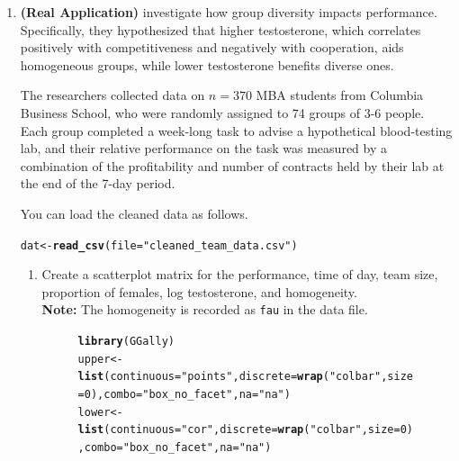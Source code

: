\documentclass{article}\usepackage[]{graphicx}\usepackage[]{xcolor}
\makeatletter
\newcommand{\hlnum}[1]{\textcolor[rgb]{0.686,0.059,0.569}{#1}}%
\newcommand{\hlsng}[1]{\textcolor[rgb]{0.192,0.494,0.8}{#1}}%
\newcommand{\hldef}[1]{\textcolor[rgb]{0.345,0.345,0.345}{#1}}%
\newcommand{\hlkwb}[1]{\textcolor[rgb]{0.69,0.353,0.396}{#1}}%
\newcommand{\hlkwc}[1]{\textcolor[rgb]{0.333,0.667,0.333}{#1}}%
\newcommand{\hlkwd}[1]{\textcolor[rgb]{0.737,0.353,0.396}{\textbf{#1}}}%
\newenvironment{kframe}{%
 \def\at@end@of@kframe{}%
 \ifinner\ifhmode%
  \def\at@end@of@kframe{\end{minipage}}%
  \begin{minipage}{\columnwidth}%
 \fi\fi%
 \def\FrameCommand##1{\hskip\@totalleftmargin \hskip-\fboxsep
 \colorbox{shadecolor}{##1}\hskip-\fboxsep
     \hskip-\linewidth \hskip-\@totalleftmargin \hskip\columnwidth}%
 \MakeFramed {\advance\hsize-\width
   \@totalleftmargin\z@ \linewidth\hsize
   \@setminipage}}%
 {\par\unskip\endMakeFramed%
 \at@end@of@kframe}
\newenvironment{knitrout}{}{} %
\makeatother
\begin{document}
\begin{enumerate}
\begin{enumerate}
  
\end{enumerate}
  \item \textbf{(Real Application)} \cite{Akinola18} investigate how group 
  diversity impacts performance. Specifically, they hypothesized that higher 
  testosterone, which correlates positively with competitiveness and negatively 
  with cooperation, aids homogeneous groups, while lower testosterone benefits 
  diverse ones.
  
  The researchers collected data on $n=370$ MBA students from Columbia 
  Business School, who were randomly assigned to 74 groups of 3-6 people.
  Each group completed a week-long task to advise a hypothetical blood-testing 
  lab, and their relative performance on the task was measured by a combination 
  of the profitability and number of contracts held by their lab at the end of 
  the 7-day period.

  You can load the cleaned data as follows.
\begin{knitrout}\scriptsize
{}\color{fgcolor}\begin{kframe}
\begin{alltt}
\hldef{dat} \hlkwb{<-} \hlkwd{read_csv}\hldef{(}\hlkwc{file} \hldef{=} \hlsng{"cleaned_team_data.csv"}\hldef{)}
\end{alltt}
\end{kframe}
\end{knitrout}
  \begin{enumerate}
      \item Create a scatterplot matrix for the performance, time of day, team
      size, proportion of females, log testosterone, and homogeneity.\\
      \textbf{Note:} The homogeneity is recorded as \texttt{fau} in the data file.
      
      \begin{figure}[H]
      \centering
\begin{knitrout}\scriptsize
{}\color{fgcolor}\begin{kframe}
\begin{alltt}
\hlkwd{library}\hldef{(GGally)}
\hldef{upper} \hlkwb{<-} \hlkwd{list}\hldef{(}\hlkwc{continuous} \hldef{=} \hlsng{"points"}\hldef{,} \hlkwc{discrete} \hldef{=} \hlkwd{wrap}\hldef{(}\hlsng{"colbar"}\hldef{,} \hlkwc{size} \hldef{=} \hlnum{0}\hldef{),} \hlkwc{combo} \hldef{=} \hlsng{"box_no_facet"}\hldef{,} \hlkwc{na} \hldef{=} \hlsng{"na"}\hldef{)}
\hldef{lower} \hlkwb{<-} \hlkwd{list}\hldef{(}\hlkwc{continuous} \hldef{=} \hlsng{"cor"}\hldef{,} \hlkwc{discrete} \hldef{=} \hlkwd{wrap}\hldef{(}\hlsng{"colbar"}\hldef{,} \hlkwc{size} \hldef{=} \hlnum{0}\hldef{),} \hlkwc{combo} \hldef{=} \hlsng{"box_no_facet"}\hldef{,} \hlkwc{na} \hldef{=} \hlsng{"na"}\hldef{)}


\end{alltt}
\end{kframe}
\end{knitrout}
\end{figure}
\end{enumerate}
\end{enumerate}
\end{document}
